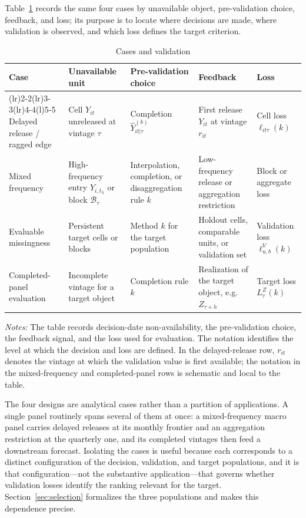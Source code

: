 \documentclass[a4paper, 12pt]{article}
\newcommand{\exhibitnote}[2][0.96\textwidth]{%
\vspace{0.65em}%
\begin{minipage}{#1}%
\footnotesize
\emph{Notes:} #2
\end{minipage}%
}
\theoremstyle{plain}
\theoremstyle{remark}
\newcommand{\1}{\mathbf{1}}
\begin{document}
Table~\ref{tab:taxonomy} records the same four cases by unavailable object, pre-validation choice, feedback, and loss; its purpose is to locate where decisions are made, where validation is observed, and which loss defines the target criterion.
\begin{table}[H]
\centering
\caption{Cases and validation}
\label{tab:taxonomy}
\setlength{\tabcolsep}{3.4pt}
\renewcommand{\arraystretch}{1.08}
\begin{tabular}{@{}>{\RaggedRight\arraybackslash}p{}>{\RaggedRight\arraybackslash}p{}>{\RaggedRight\arraybackslash}p{}>{\RaggedRight\arraybackslash}p{}>{\RaggedRight\arraybackslash}p{}@{}}
\toprule
Case & Unavailable unit & Pre-validation choice & Feedback & Loss \\
\cmidrule(lr){1-1}\cmidrule(lr){2-2}\cmidrule(lr){3-3}\cmidrule(lr){4-4}\cmidrule(l){5-5}
Delayed release / ragged edge
& Cell $Y_{it}$ unreleased at vintage $\tau$
& Completion $\widehat Y^{(k)}_{it|\tau}$
& First release $Y_{it}$ at vintage $r_{it}$
& Cell loss $\ell_{it\tau}(k)$ \\
\addlinespace[2pt]
Mixed frequency
& High-frequency entry $Y_{i,t_h}$ or block $\mathcal B_\tau$
& Interpolation, completion, or disaggregation rule $k$
& Low-frequency release or aggregation restriction
& Block or aggregate loss \\
\addlinespace[2pt]
Evaluable missingness
& Persistent target cells or blocks
& Method $k$ for the target population
& Holdout cells, comparable units, or validation set
& Validation loss $\ell^V_{u,b}(k)$ \\
\addlinespace[2pt]
Completed-panel evaluation
& Incomplete vintage for a target object
& Completion rule $k$
& Realization of the target object, e.g. $Z_{\tau+h}$
& Target loss $L^Z_\tau(k)$ \\
\bottomrule
\end{tabular}
\exhibitnote{The table records decision-date non-availability, the pre-validation choice, the feedback signal, and the loss used for evaluation. The notation identifies the level at which the decision and loss are defined. In the delayed-release row, $r_{it}$ denotes the vintage at which the validation value is first available; the notation in the mixed-frequency and completed-panel rows is schematic and local to the table.}
\end{table}

The four designs are analytical cases rather than a partition of applications. A single panel routinely spans several of them at once: a mixed-frequency macro panel carries delayed releases at its monthly frontier and an aggregation restriction at the quarterly one, and its completed vintages then feed a downstream forecast. Isolating the cases is useful because each corresponds to a distinct configuration of the decision, validation, and target populations, and it is that configuration---not the substantive application---that governs whether validation losses identify the ranking relevant for the target. Section~\ref{sec:selection} formalizes the three populations and makes this dependence precise.
\end{document}
